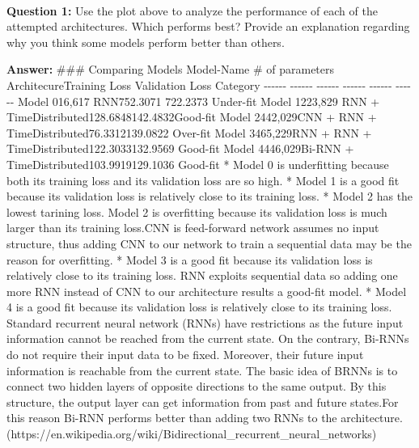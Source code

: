 \documentclass[11pt]{article}
\begin{document}
    \begin{center}
    \end{center}
    { \hspace*{\fill} \\}
    
    \textbf{Question 1:} Use the plot above to analyze the performance of
each of the attempted architectures. Which performs best? Provide an
explanation regarding why you think some models perform better than
others.

\textbf{Answer:} \#\#\# Comparing Models \textbar{}Model-Name \textbar{}
\# of parameters \textbar{} Architecure\textbar{}Training Loss
\textbar{} Validation Loss \textbar{}Category\textbar{} \textbar{}
-\/-\/-\/-\/-\/- \textbar{} -\/-\/-\/-\/-\/- \textbar{} -\/-\/-\/-\/-\/-
\textbar{}-\/-\/-\/-\/-\/- \textbar{}-\/-\/-\/-\/-\/-
\textbar{}-\/-\/-\/-\/-\/- \textbar{} \textbar{}Model 0\textbar{}16,617
\textbar{}RNN\textbar{}752.3071 \textbar{}722.2373\textbar{}
Under-fit\textbar{} \textbar{}Model 1\textbar{}223,829\textbar{} RNN +
TimeDistributed\textbar{}128.6848\textbar{}142.4832\textbar{}Good-fit\textbar{}
\textbar{}Model 2\textbar{}442,029\textbar{}CNN + RNN +
TimeDistributed\textbar{}76.3312\textbar{}139.0822\textbar{}
Over-fit\textbar{} \textbar{}Model 3\textbar{}465,229\textbar{}RNN + RNN
+ TimeDistributed\textbar{}122.3033\textbar{}132.9569\textbar{}
Good-fit\textbar{} \textbar{}Model 4\textbar{}446,029\textbar{}Bi-RNN +
TimeDistributed\textbar{}103.9919\textbar{}129.1036\textbar{}
Good-fit\textbar{} * Model 0 is underfitting because both its training
loss and its validation loss are so high. * Model 1 is a good fit
because its validation loss is relatively close to its training loss. *
Model 2 has the lowest tarining loss. Model 2 is overfitting because its
validation loss is much larger than its training loss.CNN is
feed-forward network assumes no input structure, thus adding CNN to our
network to train a sequential data may be the reason for overfitting. *
Model 3 is a good fit because its validation loss is relatively close to
its training loss. RNN exploits sequential data so adding one more RNN
instead of CNN to our architecture results a good-fit model. * Model 4
is a good fit because its validation loss is relatively close to its
training loss. Standard recurrent neural network (RNNs) have
restrictions as the future input information cannot be reached from the
current state. On the contrary, Bi-RNNs do not require their input data
to be fixed. Moreover, their future input information is reachable from
the current state. The basic idea of BRNNs is to connect two hidden
layers of opposite directions to the same output. By this structure, the
output layer can get information from past and future states.For this
reason Bi-RNN performs better than adding two RNNs to the
architecture.(https://en.wikipedia.org/wiki/Bidirectional\_recurrent\_neural\_networks)
\end{document}
